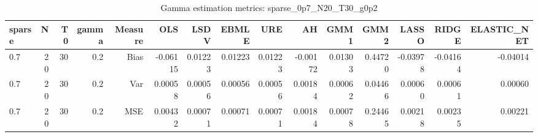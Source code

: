\begin{table}[!htbp]\centering
\caption{Gamma estimation metrics: sparse_0p7_N20_T30_g0p2}
\label{tab:table1_sparse_0p7_N20_T30_g0p2}
\begin{tabular}{lrrrrrrrrrrrrrr}
\hline
sparse & N & T0 & gamma & Measure & OLS & LSDV & EBMLE & URE & AH & GMM1 & GMM2 & LASSO & RIDGE & ELASTIC_NET \\
\hline
0.7 & 20 & 30 & 0.2 & Bias & -0.06115 & 0.01223 & 0.01223 & 0.01223 & -0.00172 & 0.01303 & 0.44720 & -0.03978 & -0.04164 & -0.04014 \\
0.7 & 20 & 30 & 0.2 & Var & 0.00058 & 0.00056 & 0.00056 & 0.00056 & 0.00184 & 0.00062 & 0.04466 & 0.00060 & 0.00061 & 0.00060 \\
0.7 & 20 & 30 & 0.2 & MSE & 0.00432 & 0.00071 & 0.00071 & 0.00071 & 0.00184 & 0.00078 & 0.24465 & 0.00218 & 0.00235 & 0.00221 \\
\hline
\end{tabular}
\end{table}

